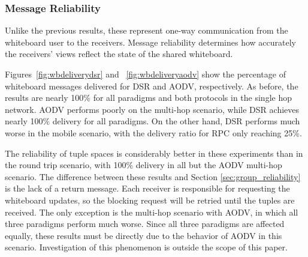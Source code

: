 \documentclass[lnicst]{svmultln}
\begin{document}
\subsubsection{Message Reliability}

Unlike the previous results, these represent one-way communication from the whiteboard user to the receivers. Message reliability determines how accurately the receivers' views reflect the state of the shared whiteboard.

Figures~\ref{fig:wbdeliverydsr} and ~\ref{fig:wbdeliveryaodv} show the percentage of whiteboard messages delivered for DSR and AODV, respectively. As before, the results are nearly 100\% for all paradigms and both protocols in the single hop network. AODV performs poorly on the multi-hop scenario, while DSR achieves nearly 100\% delivery for all paradigms. On the other hand, DSR performs much worse in the mobile scenario, with the delivery ratio for RPC only reaching 25\%.

The reliability of tuple spaces is considerably better in these experiments than in the round trip scenario, with 100\% delivery in all but the AODV multi-hop scenario. The difference between these results and Section \ref{sec:group_reliability} is the lack of a return message. Each receiver is responsible for requesting the whiteboard updates, so the blocking request will be retried until the tuples are received. The only exception is the multi-hop scenario with AODV, in which all three paradigms perform much worse. Since all three paradigms are affected equally, these results must be directly due to the behavior of AODV in this scenario. Investigation of this phenomenon is outside the scope of this paper.

\end{document}
